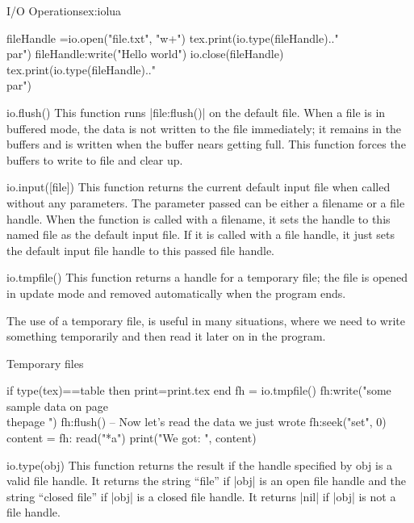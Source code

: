 \begin{texexample}{I/O Operations}{ex:iolua}
\begin{luacode}
fileHandle =io.open("file.txt", "w+")
tex.print(io.type(fileHandle).."\\par")
fileHandle:write("Hello world")
io.close(fileHandle)
tex.print(io.type(fileHandle).."\\par")
\end{luacode}
\end{texexample}

\begin{docLua}{io.flush()}
This function runs |file:flush()| on the default file. When a file is in buffered mode, the data is not
written to the file immediately; it remains in the buffers and is written when the buffer nears getting
full. This function forces the buffers to write to file and clear up.
\end{docLua}

\begin{docLua}{io.input([file])}
This function returns the current default input file when called without any parameters. The parameter
passed can be either a filename or a file handle. When the function is called with a filename, it sets
the handle to this named file as the default input file. If it is called with a file handle, it just sets the
default input file handle to this passed file handle.
\end{docLua}


\begin{docLua}{io.tmpfile()}
This function returns a handle for a temporary file; the file is opened in update mode and removed
automatically when the program ends.
\end{docLua}

The use of a temporary file, is useful in many situations, where we need to write something temporarily
and then read it later on in the program. 

\begin{texexample}{Temporary files}{}
\begin{luacode}
if type(tex)==table then print=print.tex end
fh = io.tmpfile()
fh:write("some sample data on page \\thepage ")
fh:flush()
-- Now let's read the data we just wrote
fh:seek("set", 0)
content = fh: read("*a")
print("We got: ", content)
\end{luacode}
\end{texexample}

\begin{docLua}{io.type(obj)}
This function returns the result if the handle specified by obj is a valid file handle. It returns the string
``file'' if |obj| is an open file handle and the string ``closed file'' if |obj| is a closed file handle. It
returns |nil| if |obj| is not a file handle.
\end{docLua}

